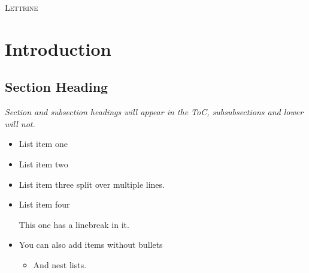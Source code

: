 \documentclass[a5paper, openany, twoside, 10pt]{memoir}
\begin{document}
\setcounter{page}{1}

\begin{vplace}
\lettrine{L}{ettrine} \lipsum[1]
\end{vplace}

%


\chapter{Introduction}

\lipsum[1]

\section{Section Heading}
\label{section-section-heading}

\emph{Section and subsection headings will appear in the ToC, subsubsections and lower will not.}
\begin{itemize}
    \item List item one
    \item List item two
    \item List item three
        split over multiple lines.
    \item List item four

    This one has a linebreak in it.

    \item[] You can also add items without bullets

    \begin{itemize}
        \item And nest lists.
    \end{itemize}
\end{itemize}
\end{document}
